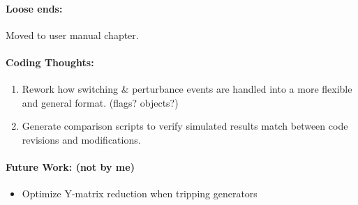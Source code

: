 \documentclass[12pt]{article}
\begin{document}
\begin{multicols}{2}
\paragraph{Loose ends:} %
Moved to user manual chapter.
	
	
\paragraph{Coding Thoughts:} 
	\begin{enumerate}

		\itemsep 0em 
		\item Rework how switching \& perturbance events are handled into a more flexible and general format. (flags? objects?)
		\item Generate comparison scripts to verify simulated results match  between code revisions and modifications.

	\end{enumerate}


\paragraph{Future Work: (not by me)}
	\begin{itemize}
	\item Optimize Y-matrix reduction when tripping generators
				

\end{itemize}
\end{multicols}
\end{document}

